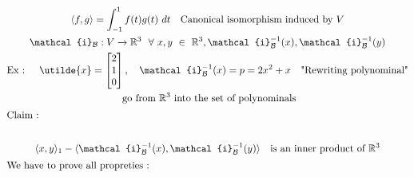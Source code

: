 \documentclass[
12pt,
]{article}
\newcommand{\la}{\langle}
\newcommand{\ra}{\rangle}
\theoremstyle{definition}
\theoremstyle{definition}
\theoremstyle{definition}
\theoremstyle{definition}
\begin{document}
\begin{gather*}
	\la f,g \ra = \int_{-1}^{1} f(t) g(t) \ dt \quad \text{Canonical isomorphism induced by $V$}\\
	\mathcal{i}_{\mathcal{B}}: V \xrightarrow{} \mathbb{R}^3 \ \ \forall \ x ,y \ \in \ \mathbb{R}^3 , \mathcal{i}_{\mathcal{B}}^{-1} (x) ,\mathcal{i}_{\mathcal{B}}^{-1} (y) \\
	\text{Ex : } \quad \utilde{x} = 
		\begin{bmatrix}
			2 \\
			1 \\
			0
		\end{bmatrix}, \quad \mathcal{i}_{\mathcal{B}}^{-1} (x)  = p = 2x^2 + x \quad \text{"Rewriting polynominal"} \\
		\text{ go from $\mathbb{R}^3$ into the set of polynominals}\\
		\intertext{Claim :} \\
		\la x,y \ra_1 - \la  \mathcal{i}_{\mathcal{B}}^{-1} (x) ,  \mathcal{i}_{\mathcal{B}}^{-1} (y) \ra \quad \text{is an inner product of $\mathbb{R}^3$}\\
		\intertext{We have to prove all propreties : }
\end{gather*}
\end{document}
